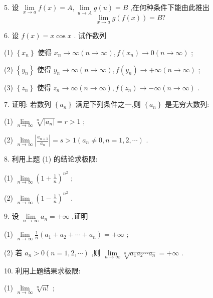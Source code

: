 5. 设 \(\mathop{\lim }\limits_{{x \rightarrow  a}}f\left( x\right)  = A,\mathop{\lim }\limits_{{u \rightarrow  A}}g\left( u\right)  = B\) ,在何种条件下能由此推出
\[
\mathop{\lim }\limits_{{x \rightarrow  a}}g\left( {f\left( x\right) }\right)  = B?
\]

6. 设 \(f\left( x\right)  = x\cos x\) . 试作数列

(1) \(\left\{  {x}_{n}\right\}\) 使得 \({x}_{n} \rightarrow  \infty \left( {n \rightarrow  \infty }\right) ,f\left( {x}_{n}\right)  \rightarrow  0\left( {n \rightarrow  \infty }\right)\) ;

(2) \(\left\{  {y}_{n}\right\}\) 使得 \({y}_{n} \rightarrow  \infty \left( {n \rightarrow  \infty }\right) ,f\left( {y}_{n}\right)  \rightarrow   + \infty \left( {n \rightarrow  \infty }\right)\) ;

(3) \(\left\{  {z}_{n}\right\}\) 使得 \({z}_{n} \rightarrow  \infty \left( {n \rightarrow  \infty }\right) ,f\left( {z}_{n}\right)  \rightarrow   - \infty \left( {n \rightarrow  \infty }\right)\) .

7. 证明: 若数列 \(\left\{  {a}_{n}\right\}\) 满足下列条件之一,则 \(\left\{  {a}_{n}\right\}\) 是无穷大数列:

(1) \(\mathop{\lim }\limits_{{n \rightarrow  \infty }}\sqrt[n]{\left| {a}_{n}\right| } = r > 1\) ;

(2) \(\mathop{\lim }\limits_{{n \rightarrow  \infty }}\left| \frac{{a}_{n + 1}}{{a}_{n}}\right|  = s > 1\left( {{a}_{n} \neq  0,n = 1,2,\cdots }\right)\) .

8. 利用上题 (1) 的结论求极限:

(1) \(\mathop{\lim }\limits_{{n \rightarrow  \infty }}{\left( 1 + \frac{1}{n}\right) }^{{n}^{2}}\) ;

(2) \(\mathop{\lim }\limits_{{n \rightarrow  \infty }}{\left( 1 - \frac{1}{n}\right) }^{{n}^{2}}\) .

9. 设 \(\mathop{\lim }\limits_{{n \rightarrow  \infty }}{a}_{n} =  + \infty\) ,证明

(1) \(\mathop{\lim }\limits_{{n \rightarrow  \infty }}\frac{1}{n}\left( {{a}_{1} + {a}_{2} + \cdots  + {a}_{n}}\right)  =  + \infty\) ;

(2) 若 \({a}_{n} > 0\left( {n = 1,2,\cdots }\right)\) ,则 \(\mathop{\lim }\limits_{{n \rightarrow  \infty }}\sqrt[n]{{a}_{1}{a}_{2}\cdots {a}_{n}} =  + \infty\) .

10. 利用上题结果求极限:

(1) \(\mathop{\lim }\limits_{{n \rightarrow  \infty }}\sqrt[n]{n!}\) ;

